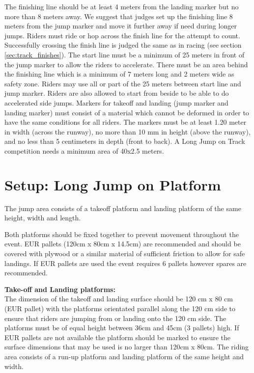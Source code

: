 The finishing line should be at least 4 meters from the landing marker but no more than 8 meters away.
We suggest that judges set up the finishing line 8 meters from the jump marker and move it further away if need during longer jumps.
Riders must ride or hop across the finish line for the attempt to count.
Successfully crossing the finish line is judged the same as in racing (see section \ref{sec:track_finishes}).
The start line must be a minimum of 25 meters in front of the jump marker to allow the riders to accelerate.
There must be an area behind the finishing line which is a minimum of 7 meters long and 2 meters wide as safety zone.
Riders may use all or part of the 25 meters between start line and jump marker.
Riders are also allowed to start from beside to be able to do accelerated side jumps.
Markers for takeoff and landing (jump marker and landing marker) must consist of a material which cannot be deformed in order to have the same conditions for all riders.
The markers must be at least 1.20 meter in width (across the runway), no more than 10 mm in height (above the runway), and no less than 5 centimeters in depth (front to back).
A Long Jump on Track competition needs a minimum area of 40x2.5 meters.

\section{Setup: Long Jump on Platform}
The jump area consists of a takeoff platform and landing platform of the same height, width and length.

Both platforms should be fixed together to prevent movement throughout the event.
EUR pallets (120cm x 80cm x 14.5cm) are recommended and should be covered with plywood or a similar material of sufficient friction to allow for safe landings.
If EUR pallets are used the event requires 6 pallets however spares are recommended.

\textbf{Take-off and Landing platforms:}\\
The dimension of the takeoff and landing surface should be 120 cm x 80 cm (EUR pallet) with the platforms orientated parallel along the 120 cm side to ensure that riders are jumping from or landing onto the 120 cm side.
The platforms must be of equal height between 36cm and 45cm (3 pallets) high.
If EUR pallets are not available the platform should be marked to ensure the surface dimensions that may be used is no larger than 120cm x 80cm.
The riding area consists of a run-up platform and landing platform of the same height and width.
